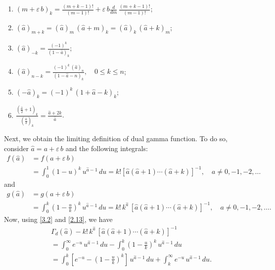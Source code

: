 \documentclass[11pt,a4paper,fleqn]{article}
\numberwithin{equation}{section}
\numberwithin{lemma}{section}
\numberwithin{theorem}{section}
\numberwithin{corollary}{section}
\begin{document}
\begin{enumerate}
	\item  $(m + \varepsilon \, b)_k = \frac{(m + k - 1)!}{(m - 1) !} + \varepsilon \, b \frac{d}{dm} \, \frac{(m + k - 1)!}{(m - 1) !}$; 
	\item  $(\widehat{a})_{m + k} = (\widehat{a})_m \, (\widehat{a} + m)_k = (\widehat{a})_k \, (\widehat{a} + k)_m$;
	\item  $(\widehat{a})_{-k} = \frac{(-1)^k}{(1 - \widehat{a})_k}$;
	\item  $(\widehat{a})_{n - k} = \frac{(-1)^k \, (\widehat{a})_n}{(1 - \widehat{a} - n)_k}, \quad 0 \le k \le n$;
	\item   $(-\widehat{a})_k = (-1)^k \, (1 + \widehat{a} - k)_k$;
	\item   $\frac{\left(\frac{\widehat{a}}{2} + 1\right)_k }{\left(\frac{\widehat{a}}{2}\right)_k} = \frac{\widehat{a} + 2k}{\widehat{a}}$.
\end{enumerate} 
Next, we obtain the limiting definition of dual gamma function. To do so, consider $\widehat{a} = a + \varepsilon \, b$ and the following integrals:
\begin{align}
	f(\widehat{a}) & = f (a + \varepsilon \, b) \nonumber\\
	& = \int_{0}^{1} (1 - u)^k \, u^{\widehat{a} - 1} \, du = k ! \left[\widehat{a} (\widehat{a} + 1) \cdots (\widehat{a} + k)\right]^{-1}, \quad a \ne 0, -1, -2, \dots\label{2.12}
\end{align}
and 
\begin{align}
	g(\widehat{a}) & = g (a + \varepsilon \, b)\nonumber\\
	& = \int_{0}^{k} \left(1 - \frac{u}{k}\right)^k \, u^{\widehat{a} - 1} \, du = k ! \, k^{\widehat{a}} \, \left[\widehat{a} (\widehat{a} + 1) \cdots (\widehat{a} + k)\right]^{-1}, \quad a \ne 0, -1, -2, \dots.\label{2.13}
\end{align}
Now, using \eqref{3.2} and \eqref{2.13}, we have
\begin{align}
	&	\Gamma_d (\widehat{a}) - k ! \, k^{\widehat{a}} \, \left[\widehat{a} (\widehat{a} + 1) \cdots (\widehat{a} + k)\right]^{-1}\nonumber\\
	& = \int_{0}^{\infty} e^{-u} \, u^{\widehat{a} - 1} \, du - \int_{0}^{k} \left(1 - \frac{u}{k}\right)^k \, u^{\widehat{a} - 1} \, du\nonumber\\
	& = \int_{0}^{k} \left[e^{-u} - \left(1 - \frac{u}{k}\right)^k \right] \, u^{\widehat{a} - 1} \, du + \int_{k}^{\infty} e^{-u} \, u^{\widehat{a} - 1} \, du.
\end{align}
\end{document}
